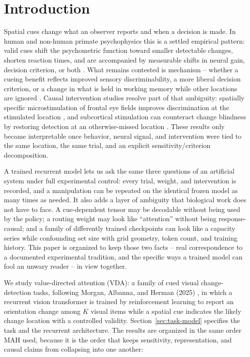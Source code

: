 \documentclass[11pt,a4paper]{article}
\begin{document}
\tableofcontents
\clearpage

\section{Introduction}
Spatial cues change what an observer reports and when a decision is made. In human and non-human primate psychophysics this is a settled empirical pattern: valid cues shift the psychometric function toward smaller detectable changes, shorten reaction times, and are accompanied by measurable shifts in neural gain, decision criterion, or both \cite{carrasco2011}. What remains contested is mechanism -- whether a cueing benefit reflects improved sensory discriminability, a more liberal decision criterion, or a change in what is held in working memory while other locations are ignored \cite{luo2018,luck1997,awh2001}. Causal intervention studies resolve part of that ambiguity: spatially specific microstimulation of frontal eye fields improves discrimination at the stimulated location \cite{moore2003}, and subcortical stimulation can counteract change blindness by restoring detection at an otherwise-missed location \cite{cavanaugh2004}. These results only became interpretable once behavior, neural signal, and intervention were tied to the same location, the same trial, and an explicit sensitivity/criterion decomposition.

A trained recurrent model lets us ask the same three questions of an artificial system under full experimental control: every trial, weight, and intervention is recorded, and a manipulation can be repeated on the identical frozen model as many times as needed. It also adds a layer of ambiguity that biological work does not have to face. A cue-dependent tensor may be decodable without being used by the policy; a routing weight may look like ``attention'' without being response-causal; and a family of differently trained checkpoints can look like a capacity series while confounding set size with grid geometry, token count, and training history. This paper is organized to keep those two facts -- real correspondence to a documented experimental tradition, and the specific ways a trained model can fool an unwary reader -- in view together.

We study value-directed attention (VDA): a family of cued visual change-detection tasks, following Morgan, Albanna, and Herman (2025) \cite{mah2025}, in which a recurrent vision transformer is trained by reinforcement learning to report an orientation change among $K$ visual items while a spatial cue indicates the likely change location with a controlled validity. Section~\ref{sec:task-model} specifies the task and the recurrent architecture. The results are organized in the same order MAH used, because it is the order that keeps sensitivity, representation, and causal claims from collapsing into one another:
\end{document}
